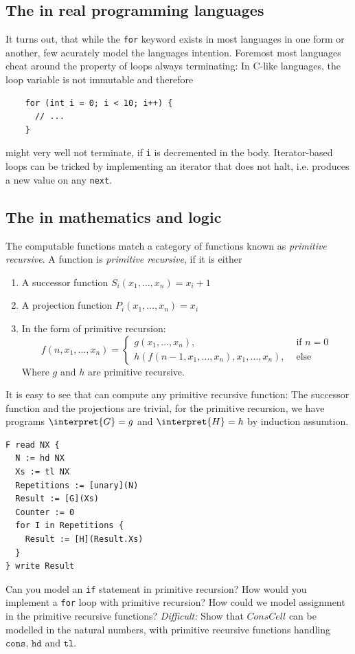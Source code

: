 \subsection{The \FOR in real programming languages}
It turns out, that while the {\tt for} keyword exists in most languages in 
one form or another, few acurately model the \FOR languages intention. 
Foremost most languages cheat around the property of \FOR loops always 
terminating: In C-like languages, the loop variable is not immutable and therefore
\begin{verbatim}
	for (int i = 0; i < 10; i++) {
	  // ...
	}
\end{verbatim}
might very well not terminate, if {\tt i} is decremented in the body. 
Iterator-based loops can be tricked by implementing an iterator that does not 
halt, i.e. produces a new value on any {\tt next}.

\subsection{The \FOR in mathematics and logic}
The \FOR computable functions match a category of functions known as 
\emph{primitive recursive}. A function is \emph{primitive recursive}, if it is either
\begin{enumerate}
	\item A successor function $S_i(x_1,\dots,x_n) = x_i+1$
	\item A projection function $P_i(x_1,\dots,x_n) = x_i$
	\item In the form of primitive recursion:
		\begin{equation*}
			f(n,x_1,\dots,x_n) = \begin{cases}
				g(x_1,\dots,x_n), &\text{ if }n=0\\
				h(f(n-1, x_1, \dots, x_n), x_1,\dots,x_n),&\text{ else}
			\end{cases}
		\end{equation*}
		Where $g$ and $h$ are primitive recursive.
\end{enumerate}
It is easy to see that \FOR can compute any primitive recursive function:
The successor function and the projections are trivial, for the primitive 
recursion, we have programs $\interpret{G}=g$ and $\interpret{H}=h$ by 
induction assumtion. 

\begin{verbatim}
F read NX {
  N := hd NX
  Xs := tl NX
  Repetitions := [unary](N)
  Result := [G](Xs)
  Counter := 0
  for I in Repetitions {
    Result := [H](Result.Xs)
  }
} write Result
\end{verbatim}

\begin{Exercise}[title={\FOR computable functions are primitive recursive}]
	\Question Can you model an {\tt if} statement in primitive recursion?
	\Question How would you implement a {\tt for} loop with primitive recursion?
	\Question How could we model assignment in the primitive recursive functions?
	\Question \emph{Difficult:} Show that $ConsCell$ can be modelled in the 
		natural numbers, with primitive recursive functions handling $\mathtt{cons}$, 
		$\mathtt{hd}$ and $\mathtt{tl}$.
\end{Exercise}
